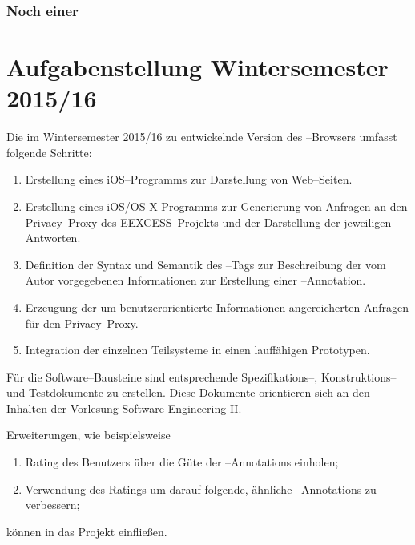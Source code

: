 \subsubsection{Noch einer}

\section{Aufgabenstellung Wintersemester 2015/16}
Die im Wintersemester 2015/16 zu entwickelnde Version des
\SECH--Browsers umfasst folgende Schritte:
\begin{enumerate}
     \item Erstellung eines iOS--Programms zur Darstellung von
    Web--Seiten.
     \item Erstellung eines iOS/OS X Programms zur Generierung von
    Anfragen an den Privacy--Proxy des EEXCESS--Projekts und der
    Darstellung der jeweiligen Antworten.
     \item Definition der Syntax und Semantik des \SEARCH--Tags
    zur Beschreibung der vom Autor vorgegebenen Informationen zur
    Erstellung einer \SECH--Annotation.
     \item Erzeugung der um benutzerorientierte Informationen
    angereicherten Anfragen für den Privacy--Proxy.
     \item Integration der einzelnen Teilsysteme in einen lauffähigen
    Prototypen. 
\end{enumerate}
Für die Software--Bausteine sind entsprechende Spezifikations--,
Konstruktions-- und Testdokumente zu erstellen. Diese Dokumente
orientieren sich an den Inhalten der Vorlesung \glqq Software
Engineering II\grqq.
 
Erweiterungen, wie beispielsweise
\begin{enumerate}
     \item Rating des Benutzers über die Güte der \SECH--Annotations einholen;
     \item Verwendung des Ratings um darauf folgende, ähnliche
    \SECH--Annotations zu verbessern;
\end{enumerate}
können in das Projekt einfließen.
